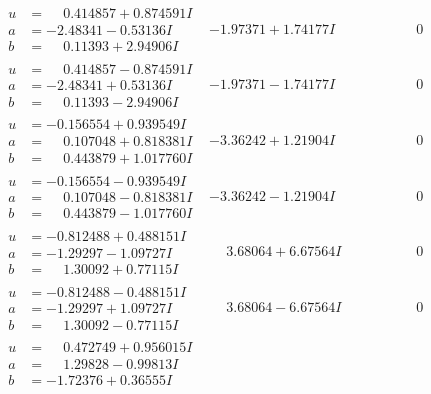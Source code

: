 \documentclass[1p]{elsarticle_modified}
\theoremstyle{definition}
\begin{document}
$$\begin{array}{c|c|c}
 \hline 
\begin{aligned}
u &= \phantom{-}0.414857 + 0.874591 I \\
a &= -2.48341 - 0.53136 I \\
b &= \phantom{-}0.11393 + 2.94906 I\end{aligned}
 & -1.97371 + 1.74177 I & \phantom{-0.000000 } 0 \\ \hline\begin{aligned}
u &= \phantom{-}0.414857 - 0.874591 I \\
a &= -2.48341 + 0.53136 I \\
b &= \phantom{-}0.11393 - 2.94906 I\end{aligned}
 & -1.97371 - 1.74177 I & \phantom{-0.000000 } 0 \\ \hline\begin{aligned}
u &= -0.156554 + 0.939549 I \\
a &= \phantom{-}0.107048 + 0.818381 I \\
b &= \phantom{-}0.443879 + 1.017760 I\end{aligned}
 & -3.36242 + 1.21904 I & \phantom{-0.000000 } 0 \\ \hline\begin{aligned}
u &= -0.156554 - 0.939549 I \\
a &= \phantom{-}0.107048 - 0.818381 I \\
b &= \phantom{-}0.443879 - 1.017760 I\end{aligned}
 & -3.36242 - 1.21904 I & \phantom{-0.000000 } 0 \\ \hline\begin{aligned}
u &= -0.812488 + 0.488151 I \\
a &= -1.29297 - 1.09727 I \\
b &= \phantom{-}1.30092 + 0.77115 I\end{aligned}
 & \phantom{-}3.68064 + 6.67564 I & \phantom{-0.000000 } 0 \\ \hline\begin{aligned}
u &= -0.812488 - 0.488151 I \\
a &= -1.29297 + 1.09727 I \\
b &= \phantom{-}1.30092 - 0.77115 I\end{aligned}
 & \phantom{-}3.68064 - 6.67564 I & \phantom{-0.000000 } 0 \\ \hline\begin{aligned}
u &= \phantom{-}0.472749 + 0.956015 I \\
a &= \phantom{-}1.29828 - 0.99813 I \\
b &= -1.72376 + 0.36555 I\end{aligned}

\end{array}$$
\end{document}
